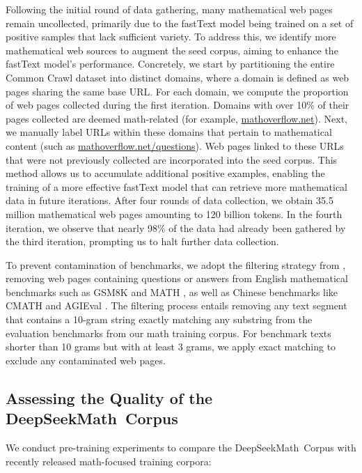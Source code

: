 Following the initial round of data gathering, many mathematical web pages remain uncollected, primarily due to the fastText model being trained on a set of positive samples that lack sufficient variety. To address this, we identify more mathematical web sources to augment the seed corpus, aiming to enhance the fastText model's performance. Concretely, we start by partitioning the entire Common Crawl dataset into distinct domains, where a domain is defined as web pages sharing the same base URL. For each domain, we compute the proportion of web pages collected during the first iteration. Domains with over 10\% of their pages collected are deemed math-related (for example, \url{mathoverflow.net}). Next, we manually label URLs within these domains that pertain to mathematical content (such as \url{mathoverflow.net/questions}). Web pages linked to these URLs that were not previously collected are incorporated into the seed corpus. This method allows us to accumulate additional positive examples, enabling the training of a more effective fastText model that can retrieve more mathematical data in future iterations. After four rounds of data collection, we obtain 35.5 million mathematical web pages amounting to 120 billion tokens. In the fourth iteration, we observe that nearly 98\% of the data had already been gathered by the third iteration, prompting us to halt further data collection.

To prevent contamination of benchmarks, we adopt the filtering strategy from \cite{deepseek-coder}, removing web pages containing questions or answers from English mathematical benchmarks such as GSM8K \citep{gsm8k} and MATH \citep{MATH}, as well as Chinese benchmarks like CMATH \citep{wei2023cmath} and AGIEval \citep{agieval}. The filtering process entails removing any text segment that contains a 10-gram string exactly matching any substring from the evaluation benchmarks from our math training corpus. For benchmark texts shorter than 10 grams but with at least 3 grams, we apply exact matching to exclude any contaminated web pages.

\subsection{Assessing the Quality of the DeepSeekMath~Corpus}

We conduct pre-training experiments to compare the DeepSeekMath~Corpus with recently released math-focused training corpora:

